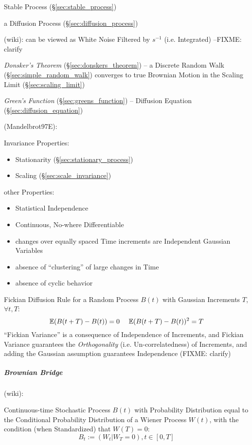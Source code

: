 Stable Process (\S\ref{sec:stable_process})

a Diffusion Process (\S\ref{sec:diffusion_process})

(wiki):
can be viewed as White Noise Filtered by $s^{-1}$ (i.e. Integrated)
--FIXME: clarify

\emph{Donsker's Theorem} (\S\ref{sec:donskers_theorem}) -- a Discrete Random
Walk (\S\ref{sec:simple_random_walk}) converges to true Brownian Motion in the
Scaling Limit (\S\ref{sec:scaling_limit})

\emph{Green's Function} (\S\ref{sec:greens_function}) -- Diffusion Equation
(\S\ref{sec:diffusion_equation})

(Mandelbrot97E):

Invariance Properties:
\begin{itemize}
  \item Stationarity (\S\ref{sec:stationary_process})
  \item Scaling (\S\ref{sec:scale_invariance})
\end{itemize}

other Properties:
\begin{itemize}
  \item Statistical Independence
  \item Continuous, No-where Differentiable
  \item changes over equally spaced Time increments are Independent Gaussian
    Variables
  \item absence of ``clustering'' of large changes in Time
  \item absence of cyclic behavior
\end{itemize}

Fickian Diffusion Rule for a Random Process $B(t)$ with Gaussian Increments $T$,
$\forall t, T$:
\[
  \expect(B(t+T) - B(t)) = 0 \ \ \ \ \expect(B(t+T) - B(t))^2 = T
\]
``Fickian Variance'' is a consequence of Independence of Increments, and Fickian
Variance guarantees the \emph{Orthogonality} (i.e. Un-correlatedness) of
Increments, and adding the Gaussian assumption guarantees Independence (FIXME:
clarify)



\subparagraph{Brownian Bridge}\label{sec:brownian_bridge}\hfill

(wiki):

Continuous-time Stochastic Process $B(t)$ with Probability Distribution equal to
the Conditional Probability Distribution of a Wiener Process $W(t)$, with the
condition (when Standardized) that $W(T) = 0$:
\[
  B_t := (W_t | W_T = 0), t \in [0,T]
\]

